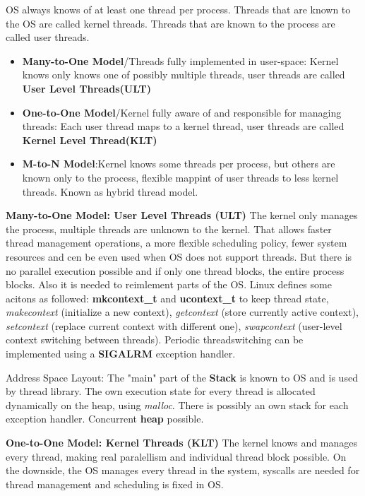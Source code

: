 \documentclass[11pt,a4paper]{article}
\begin{document}
	OS always knows of at least one thread per process. Threads that are known to the OS are called kernel threads. Threads that are known to the process are called user threads.
	
	\begin{itemize}
		\item \textbf{Many-to-One Model}/Threads fully implemented in user-space: Kernel knows only knows one of possibly multiple threads, user threads are called \textbf{User Level Threads(ULT)}
		\item \textbf{One-to-One Model}/Kernel fully aware of and responsible for managing threads: Each user thread maps to a kernel thread, user threads are called \textbf{Kernel Level Thread(KLT)}
		\item \textbf{M-to-N Model}:Kernel knows some threads per process, but others are known only to the process, flexible mappint of user threads to less kernel threads. Known as hybrid thread model.
	\end{itemize}
	
	
	\textbf{Many-to-One Model: User Level Threads (ULT)} \newline
	The kernel only manages the process, multiple threads are unknown to the kernel. That allows faster thread management operations, a more flexible scheduling policy, fewer system resources and cen be even used when OS does not support threads. But there is no parallel execution possible and if only one thread blocks, the entire process blocks. Also it is needed to reimlement parts of the OS. Linux defines some acitons as followed: \textbf{mkcontext\_t} and \textbf{ucontext\_t} to keep thread state, \textit{makecontext} (initialize a new context), \textit{getcontext} (store currently active context), \textit{setcontext} (replace current context with different one), \textit{swapcontext} (user-level context switching between threads). Periodic threadswitching can be implemented using a \textbf{SIGALRM} exception handler.
	
	Address Space Layout: The "main" part of the \textbf{Stack} is known to OS and is used by thread library. The own execution state for every thread is allocated dynamically on the heap, using \textit{malloc}. There is possibly an own stack for each exception handler. Concurrent \textbf{heap} possible. \newline
	
	\textbf{One-to-One Model: Kernel Threads (KLT)} \newline
	The kernel knows and manages every thread, making real paralellism and individual thread block possible. On the downside, the OS manages every thread in the system, syscalls are needed for thread management and scheduling is fixed in OS.
	
\end{document}
